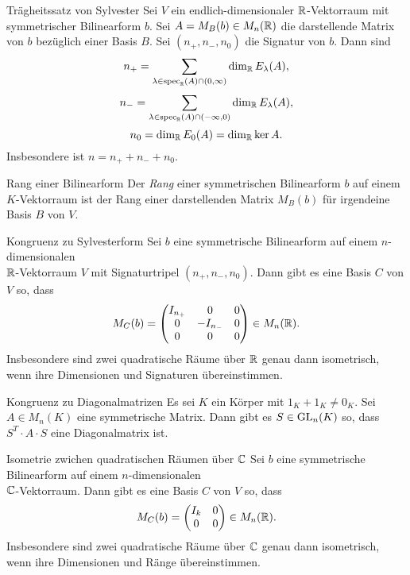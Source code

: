 \documentclass[main.tex]{subfiles}
\begin{document}
\begin{karte}{Trägheitssatz von Sylvester}
    Sei \( V \) ein endlich-dimensionaler \( \mathbb{R} \)-Vektorraum 
    mit symmetrischer Bilinearform \(b\). Sei \(A = M_B(b) \in M_n(\mathbb{R})\) 
    die darstellende Matrix von \(b\) bezüglich einer Basis 
    \(B\). Sei \( (n_+,n_-,n_0) \) die Signatur von \(b\). 
    Dann sind 
    \[ n_+ = \sum_{\lambda\in \operatorname{spec}_{\mathbb{R}}(A)\cap(0,\infty)} \dim_{\mathbb{R}} E_\lambda(A), \]
    \[ n_- = \sum_{\lambda\in \operatorname{spec}_{\mathbb{R}}(A)\cap(-\infty,0)} \dim_{\mathbb{R}} E_\lambda(A), \]
    \[ n_0 = \dim_{\mathbb{R}} E_0(A) = \dim_{\mathbb{R}} \ker A. \]
    Insbesondere ist \( n = n_+ + n_- + n_0 \).
\end{karte}

\begin{karte}{Rang einer Bilinearform}
    Der \textit{Rang} einer symmetrischen Bilinearform \(b\) 
    auf einem \( K \)-Vektorraum ist der Rang einer 
    darstellenden Matrix \( M_B(b) \) für irgendeine 
    Basis \(B\) von \(V\).
\end{karte}

\begin{karte}{Kongruenz zu Sylvesterform}
    Sei \(b\) eine symmetrische Bilinearform auf einem 
    \(n\)-dimensionalen \\
    \(\mathbb{R}\)-Vektorraum \(V\) mit 
    Signaturtripel \( (n_+, n_-, n_0) \). Dann gibt 
    es eine Basis \(C\) von \(V\) so, dass 
    \[ M_C(b) = \begin{pmatrix}
        I_{n_+} & 0 & 0 \\
        0 & -I_{n_-} & 0 \\
        0 & 0 & 0
    \end{pmatrix} \in M_n(\mathbb{R}). \]
    Insbesondere sind zwei quadratische Räume über \(\mathbb{R}\) 
    genau dann isometrisch, wenn ihre Dimensionen und 
    Signaturen übereinstimmen.
\end{karte}

\begin{karte}{Kongruenz zu Diagonalmatrizen}
    Es sei \(K\) ein Körper mit \( 1_K + 1_K \neq 0_K \). 
    Sei \(A \in M_n(K)\) eine symmetrische Matrix. Dann 
    gibt es \( S \in \operatorname{GL}_n(K) \) so, dass \(S^T \cdot A \cdot S\) 
    eine Diagonalmatrix ist.
\end{karte}

\begin{karte}{Isometrie zwichen quadratischen Räumen über \(\mathbb{C}\)}
    Sei \(b\) eine symmetrische Bilinearform auf einem 
    \(n\)-dimensionalen \\
    \(\mathbb{C}\)-Vektorraum. Dann gibt es eine 
    Basis \(C\) von \(V\) so, dass 
    \[ M_C(b) = \begin{pmatrix}
        I_k & 0 \\
        0 & 0
    \end{pmatrix} \in M_n(\mathbb{R}). \]
    Insbesondere sind zwei quadratische Räume über \(\mathbb{C}\) 
    genau dann isometrisch, wenn ihre Dimensionen und Ränge 
    übereinstimmen.
\end{karte}
\end{document}
